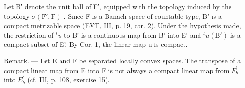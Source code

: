 Let B′ denote the unit ball of F′, equipped with the topology induced by the topology \(\sigma(\mathrm{F}',\mathrm{F})\) . Since F is a Banach space of countable type, B' is a compact metrizable space (EVT, III, p. 19, cor. 2). Under the hypothesis made, the restriction of \({}^{t}u\) to B' is a continuous map from B' into E' and \({}^{t}u(\mathrm{B}')\) is a compact subset of E'. By Cor. 1, the linear map u is compact.

Remark. --- Let E and F be separated locally convex spaces. The transpose of a compact linear map from E into F is not always a compact linear map from \(F_{b}^{\prime}\) into \(E_{b}^{\prime}\) (cf. III, p. 108, exercise 15).

